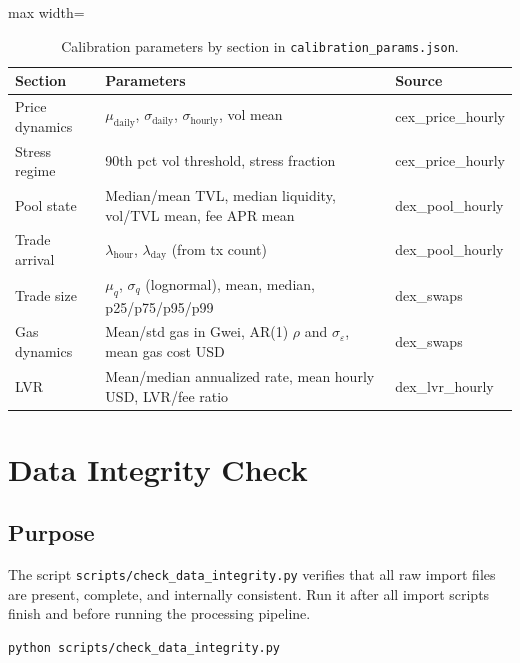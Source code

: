 \documentclass[11pt,a4paper]{article}
\begin{document}
\begin{table}[H]
\centering
\small
\begin{adjustbox}{max width=\textwidth}
\begin{tabular}{lll}
\toprule
\textbf{Section} & \textbf{Parameters} & \textbf{Source} \\
\midrule
Price dynamics    & $\mu_{\mathrm{daily}}$, $\sigma_{\mathrm{daily}}$, $\sigma_{\mathrm{hourly}}$, vol mean & cex\_price\_hourly \\
Stress regime     & 90th pct vol threshold, stress fraction & cex\_price\_hourly \\
Pool state        & Median/mean TVL, median liquidity, vol/TVL mean, fee APR mean & dex\_pool\_hourly \\
Trade arrival     & $\lambda_{\mathrm{hour}}$, $\lambda_{\mathrm{day}}$ (from tx count) & dex\_pool\_hourly \\
Trade size        & $\mu_q$, $\sigma_q$ (lognormal), mean, median, p25/p75/p95/p99 & dex\_swaps \\
Gas dynamics      & Mean/std gas in Gwei, AR(1) $\rho$ and $\sigma_\varepsilon$, mean gas cost USD & dex\_swaps \\
LVR               & Mean/median annualized rate, mean hourly USD, LVR/fee ratio & dex\_lvr\_hourly \\
\bottomrule
\end{tabular}
\end{adjustbox}
\caption{Calibration parameters by section in \texttt{calibration\_params.json}.}
\end{table}

\section{Data Integrity Check}

\subsection{Purpose}

The script \texttt{scripts/check\_data\_integrity.py} verifies that all raw import files are present, complete, and internally consistent. Run it after all import scripts finish and before running the processing pipeline.

\begin{lstlisting}
python scripts/check_data_integrity.py
\end{lstlisting}
\end{document}
